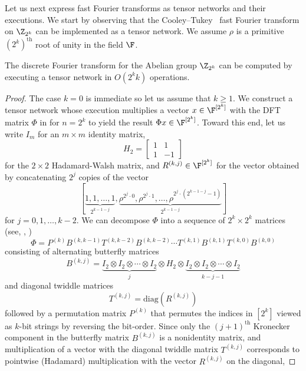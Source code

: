 Let us next express fast Fourier transforms as tensor networks and their
executions.
We start by observing that the Cooley--Tukey~\cite{CooleyT1965} fast
Fourier transform on $\Z_{2^k}$ can be implemented as a tensor network.
We assume $\rho$ is a primitive $(2^k)^\text{th}$ root of unity in
the field $\F$.

\begin{lemma}
\label{lem:fft}
The discrete Fourier transform for the Abelian group $\Z_{2^k}$ can
be computed by executing a tensor network in $O(2^kk)$ operations.
\end{lemma}
\begin{proof}
The case $k=0$ is immediate so let us assume that $k\geq 1$.
We construct a tensor
network whose execution multiplies a vector $x\in\F^{[2^k]}$ with the DFT
matrix $\Phi$ in  for $n=2^k$
to yield the result $\Phi x\in\F^{[2^k]}$.
Toward this end, let us write $I_m$ for an
$m\times m$ identity matrix,
\begin{equation}
\label{eq:h2}
H_2=\left[\begin{array}{rr}1&1\\1&-1\end{array}\right]
\end{equation}
for the $2\times 2$ Hadamard-Walsh matrix, and
$R^{(k,j)}\in\F^{[2^k]}$ for the vector obtained by concatenating
$2^j$ copies of the vector
\[
[\underbrace{1,1,\ldots,1}_{2^{k-1-j}},
 \underbrace{\rho^{2^j\cdot 0},\rho^{2^j\cdot 1},\ldots,\rho^{2^j\cdot(2^{k-1-j}-1)}}_{2^{k-1-j}}]
\]
for $j=0,1,\ldots,k-2$.
%
%
We can decompose $\Phi$ into a sequence
of $2^k\times 2^k$ matrices 
(see, \eg, \cite{VanLoan1992})  %
\begin{equation}
\label{eq:cooley-tukey}
\Phi=P^{(k)}B^{(k,k-1)}T^{(k,k-2)}B^{(k,k-2)}\cdots T^{(k,1)}B^{(k,1)}T^{(k,0)}B^{(k,0)}
\end{equation}
consisting of alternating butterfly matrices
\[
B^{(k,j)}=
\underbrace{I_2\otimes I_2\otimes \cdots\otimes I_2}_{j}
\otimes H_2 \otimes
\underbrace{I_2\otimes I_2\otimes \cdots\otimes I_2}_{k-j-1}
\]
and diagonal twiddle matrices
\[
T^{(k,j)}=\text{diag}(R^{(k,j)})
\]
followed by a permutation matrix $P^{(k)}$ that permutes the indices
in $[2^k]$ viewed as $k$-bit strings by reversing the bit-order.
Since only the $(j+1)^\text{th}$ Kronecker component in the butterfly
matrix $B^{(k,j)}$ is a nonidentity matrix, and multiplication of
a vector with the diagonal twiddle matrix $T^{(k,j)}$
corresponds to pointwise (Hadamard) multiplication with the
vector $R^{(k,j)}$ on the diagonal,

\end{proof}
